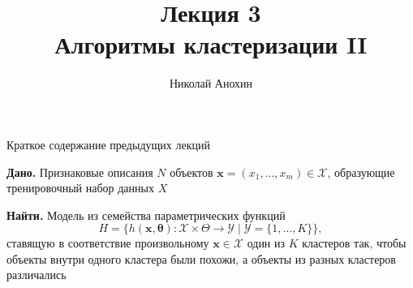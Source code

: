 \documentclass[aspectratio=169]{beamer}
\author{Николай Анохин}
\title{\newline \newline \newline Лекция 3 \\ Алгоритмы кластеризации II}
\let\otp\titlepage
\renewcommand{\titlepage}{\otp\addtocounter{framenumber}{-1}}
\begin{document}
\begin{frame}[plain]
\titlepage
\end{frame}

\begin{frame}{Краткое содержание предыдущих лекций}

\vspace{1em}
{\bf Дано.} Признаковые описания $N$ объектов $\mathbf{x} = (x_1, \ldots, x_m) \in \mathcal{X}$, образующие тренировочный набор данных $X$

\vspace{1em}
{\bf Найти.} Модель из семейства параметрических функций 
\[
H = \{h(\mathbf{x, \mathbf{\theta}}): \mathcal{X} \times \Theta \rightarrow \mathcal{Y} \mid \mathcal{Y} = \{1, \ldots, K\}\},
\]
ставящую в соответствие произвольному $\mathbf{x} \in \mathcal{X}$ один из $K$ кластеров так, чтобы объекты внутри одного кластера были похожи, а объекты из разных кластеров различались

\end{frame}
\end{document}
